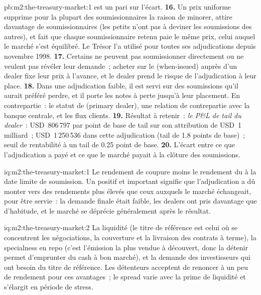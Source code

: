 \begin{solution}{pb:m2:the-treasury-market:1}
est un pari sur l'écart.
\textbf{16.} Un prix uniforme supprime pour la plupart des soumissionnaires la raison de minorer, attire davantage
de soumissionnaires (les petits n'ont pas à deviner les soumissions des autres), et fait que chaque
soumissionnaire retenu paie le même prix, celui auquel le marché s'est équilibré. Le Trésor l'a utilisé
pour toutes ses adjudications depuis novembre 1998.
\textbf{17.} Certains ne peuvent pas soumissionner directement ou ne veulent pas révéler leur demande~;
acheter sur le  (when-issued) auprès d'un dealer fixe leur prix à l'avance, et le dealer
prend le risque de l'adjudication à leur place.
\textbf{18.} Dans une adjudication faible, il est servi sur des soumissions qu'il aurait préféré perdre, et
il porte les notes à perte jusqu'à leur placement. En contrepartie~: le statut de
 (primary dealer), une relation de contrepartie avec la banque centrale, et les
flux clients.
\textbf{19.} Résultat à retenir~: \emph{le P\&L de tail du dealer}~: USD~806\,797 par
point de base de tail sur son attribution de USD~1 milliard~; USD~1\,250\,536 dans cette adjudication
(tail de 1.8 points de base)~; seuil de rentabilité à un tail de 0.25 point de base.
\textbf{20.} L'écart entre ce que l'adjudication a payé et ce que le marché
payait à la clôture des soumissions.
\end{solution}

\begin{solution}{iq:m2:the-treasury-market:1}
Le rendement de coupure moins le rendement du  à la date limite de soumission. Un  positif et important
signifie que l'adjudication a dû monter vers des rendements plus élevés que ceux auxquels le marché échangeait, pour être servie~:
la demande finale était faible, les dealers ont pris davantage que d'habitude,
et le marché se déprécie généralement après le résultat.
\end{solution}

\begin{solution}{iq:m2:the-treasury-market:2}
La liquidité (le titre de référence est celui où se concentrent les négociations, la couverture et la livraison des contrats à terme),
la specialness en repo (c'est l'émission la plus vendue à découvert, donc la détenir permet d'emprunter du cash à bon marché),
et la demande des investisseurs qui ont besoin du titre de référence.
Les détenteurs acceptent de renoncer à un peu de rendement pour ces avantages~; le spread varie avec la prime de liquidité
et s'élargit en période de stress.
\end{solution}

